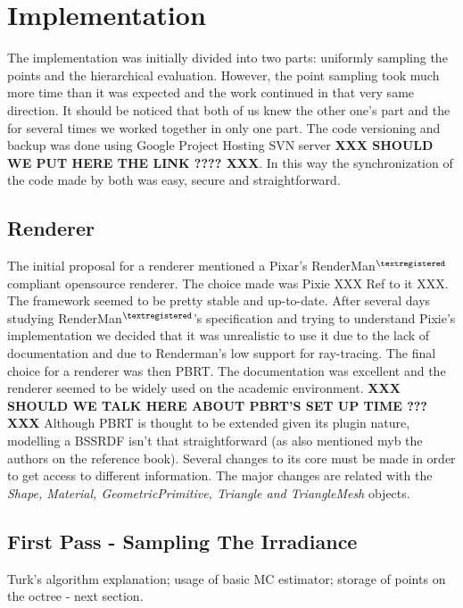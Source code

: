 \documentclass{article}
\begin{document}
\section{Implementation}
The implementation was initially divided into two parts: uniformly sampling the points and the hierarchical evaluation. However, the point sampling took much more time than it was expected and the work continued in that very same direction. It should be noticed that both of us knew the other one's part and the for several times we worked together in only one part.\linebreak
The code versioning and backup was done using Google Project Hosting SVN server\textbf{  XXX SHOULD WE PUT HERE THE LINK ???? XXX}. In this way the synchronization of the code made by both was easy, secure and straightforward.

\subsection{Renderer}
The initial proposal for a renderer mentioned a Pixar's RenderMan$^{\textregistered}$ compliant opensource renderer. The choice made was Pixie XXX Ref to it XXX. The framework seemed to be pretty stable and up-to-date. After several days studying RenderMan$^{\textregistered}$'s specification and trying to understand Pixie's implementation we decided that it was unrealistic to use it due to the lack of documentation and due to Renderman's low support for ray-tracing.\linebreak
The final choice for a renderer was then PBRT. The documentation was excellent and the renderer seemed to be widely used on the academic environment.\linebreak
\textbf{ XXX SHOULD WE TALK HERE ABOUT PBRT'S SET UP TIME ??? XXX }
Although PBRT is thought to be extended given its plugin nature, modelling a BSSRDF isn't that straightforward (as also mentioned myb the authors on the reference book). Several changes to its core must be made in order to get access to different information. The major changes are related with the {\it Shape, Material, GeometricPrimitive, Triangle and TriangleMesh} objects.

\subsection{First Pass - Sampling The Irradiance}
Turk's algorithm explanation; usage of basic MC estimator; storage of points on the octree - next section.
\end{document}
